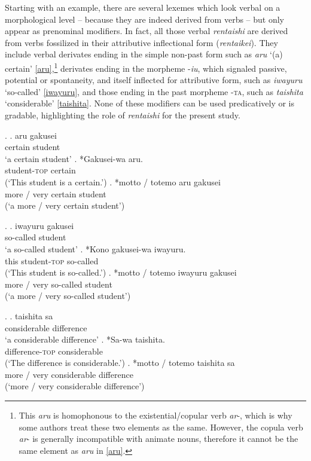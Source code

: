 Starting with an example, there are several lexemes which look verbal on a morphological level -- because they are indeed derived from verbs -- but only appear as prenominal modifiers. In fact, all those verbal \textit{rentaishi} are derived from verbs fossilized in their attributive inflectional form (\textit{rentaikei}). They include verbal derivates ending in the simple non-past form such as \textit{aru} `(a) certain’ \ref{aru},\footnote{This \textit{aru} is homophonous to the existential/copular verb \textit{ar}-, which is why some authors \citep{lehmann:2015:japanisch} treat these two elements as the same. However, the copula verb \textit{ar}- is generally incompatible with animate nouns, therefore it cannot be the same element as \textit{aru} in \ref{aru}.} derivates ending in the morpheme -\textit{iu}, which signaled passive, potential or spontaneity, and itself inflected for attributive form, such as \textit{iwayuru} `so-called’ \ref{iwayuru}, and those ending in the past morpheme -\textsc{ta}, such as \textit{taishita} `considerable’ \ref{taishita}. None of these modifiers can be used predicatively or is gradable, highlighting the role of \textit{rentaishi} for the present study.

\ex. \label{aru} \ag. aru gakusei\\
certain student\\
`a certain student'
\bg. *Gakusei-wa aru.\\
student-\textsc{top} certain\\
(`This student is a certain.’)
\cg. *motto / totemo aru gakusei\\
more / very certain student\\
(`a more / very certain student’)

\ex. \label{iwayuru} \ag. iwayuru gakusei\\
so-called student\\
`a so-called student'
\bg. *Kono gakusei-wa iwayuru.\\
this student-\textsc{top} so-called\\
(`This student is so-called.’)
\cg. *motto / totemo iwayuru gakusei\\
more / very so-called student\\
(`a more / very so-called student’)

\ex. \label{taishita} \ag. taishita sa\\
considerable difference\\
`a considerable difference’
\bg. *Sa-wa taishita.\\
difference-\textsc{top} considerable\\
(`The difference is considerable.’)
\cg. *motto / totemo taishita sa\\
more / very considerable difference\\
(`more / very considerable difference’)

